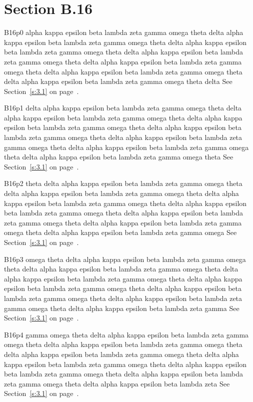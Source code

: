 \section{Section B.16}\label{s:B.16}
B16p0 alpha kappa epsilon beta lambda zeta gamma omega theta delta alpha kappa epsilon beta lambda zeta gamma omega theta delta alpha kappa epsilon beta lambda zeta gamma omega theta delta alpha kappa epsilon beta lambda zeta gamma omega theta delta alpha kappa epsilon beta lambda zeta gamma omega theta delta alpha kappa epsilon beta lambda zeta gamma omega theta delta alpha kappa epsilon beta lambda zeta gamma omega theta delta See Section~\ref{s:3.1} on page~\pageref{s:3.1}.

B16p1 delta alpha kappa epsilon beta lambda zeta gamma omega theta delta alpha kappa epsilon beta lambda zeta gamma omega theta delta alpha kappa epsilon beta lambda zeta gamma omega theta delta alpha kappa epsilon beta lambda zeta gamma omega theta delta alpha kappa epsilon beta lambda zeta gamma omega theta delta alpha kappa epsilon beta lambda zeta gamma omega theta delta alpha kappa epsilon beta lambda zeta gamma omega theta See Section~\ref{s:3.1} on page~\pageref{s:3.1}.

B16p2 theta delta alpha kappa epsilon beta lambda zeta gamma omega theta delta alpha kappa epsilon beta lambda zeta gamma omega theta delta alpha kappa epsilon beta lambda zeta gamma omega theta delta alpha kappa epsilon beta lambda zeta gamma omega theta delta alpha kappa epsilon beta lambda zeta gamma omega theta delta alpha kappa epsilon beta lambda zeta gamma omega theta delta alpha kappa epsilon beta lambda zeta gamma omega See Section~\ref{s:3.1} on page~\pageref{s:3.1}.

B16p3 omega theta delta alpha kappa epsilon beta lambda zeta gamma omega theta delta alpha kappa epsilon beta lambda zeta gamma omega theta delta alpha kappa epsilon beta lambda zeta gamma omega theta delta alpha kappa epsilon beta lambda zeta gamma omega theta delta alpha kappa epsilon beta lambda zeta gamma omega theta delta alpha kappa epsilon beta lambda zeta gamma omega theta delta alpha kappa epsilon beta lambda zeta gamma See Section~\ref{s:3.1} on page~\pageref{s:3.1}.

B16p4 gamma omega theta delta alpha kappa epsilon beta lambda zeta gamma omega theta delta alpha kappa epsilon beta lambda zeta gamma omega theta delta alpha kappa epsilon beta lambda zeta gamma omega theta delta alpha kappa epsilon beta lambda zeta gamma omega theta delta alpha kappa epsilon beta lambda zeta gamma omega theta delta alpha kappa epsilon beta lambda zeta gamma omega theta delta alpha kappa epsilon beta lambda zeta See Section~\ref{s:3.1} on page~\pageref{s:3.1}.

